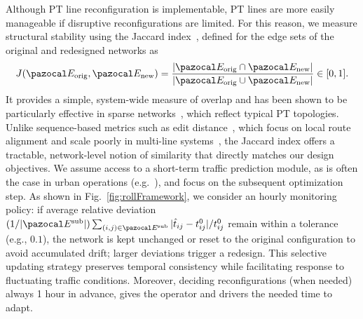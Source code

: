 \documentclass[a4paper,fleqn]{cas-sc}
\begin{document}
Although PT line reconfiguration is implementable, PT lines are more easily manageable if disruptive reconfigurations are limited. For this reason, we measure structural stability using the Jaccard index~\citep{jaccard1901etude}, defined for the edge sets of the original and redesigned networks as
\begin{equation}
J(\pazocal E_{\text{orig}},\pazocal E_{\text{new}})
=\frac{|\pazocal E_{\text{orig}}\cap \pazocal E_{\text{new}}|}
       {|\pazocal E_{\text{orig}}\cup \pazocal E_{\text{new}}|}\in[0,1].
\label{eq:jaccard}
\end{equation}
It provides a simple, system-wide measure of overlap and has been shown to be particularly effective in sparse networks~\citep{travieso2024analytical}, which reflect typical PT topologies. Unlike sequence-based metrics such as edit distance~\citep{cheng2025computing}, which focus on local route alignment and scale poorly in multi-line systems~\citep{jain2024graph}, the Jaccard index offers a tractable, network-level notion of similarity that directly matches our design objectives.
%
We assume access to a short-term traffic prediction module, as is often the case in urban operations (e.g.~\citep{MTASchedules,TfLLiveBusArrivals}), and focus on the subsequent optimization step. As shown in Fig.~\ref{fig:rollFramework}, we consider an hourly monitoring policy: if average relative deviation $(1/|\pazocal E^\text{sub}|)  \sum_{(i,j)\in\pazocal E^\text{sub}}|\hat t_{ij}-t_{ij}^0|/t_{ij}^0$ remain within a tolerance (e.g., $0.1$), the network is kept unchanged or reset to the original configuration to avoid accumulated drift; larger deviations trigger a redesign. This selective updating strategy preserves temporal consistency while facilitating response to fluctuating traffic conditions. Moreover, deciding reconfigurations (when needed) always 1 hour in advance, gives the operator and drivers the needed time to adapt.
\end{document}
